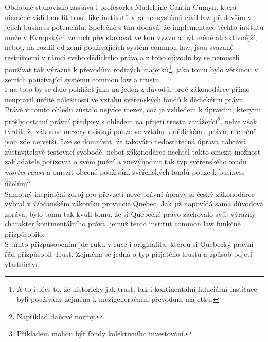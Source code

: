 \documentclass{article}
\begin{document}
Obdobné stanovisko zastává i profesorka Madeleine Cantin Cumyn, která nicméně vidí benefit trust like institutů v rámci systémů civil law především v jejich business potenciálu. Společně s tím dodává, že implementace těchto intitutů může v Evropských zemích představovat velkou výzvu a být méně atraktivnější, neboť, na rozdíl od zemí používajících systém common law, jsou svázané restrikcemi v rámci svého dědického práva a z toho důvodu by se nemuseli používat tak výrazně k převodům rodiných majetků\footnote{A to i přes to, že historicky jak trust, tak i kontinentální fiduciární instituce byli používány zejména k mezigeneračním převodům majetku.}, jako tomu bylo většinou v zemích používající systému common law a trustu.\\


I na toto by se dalo pohlížet jako na jeden z důvodů, proč zákonodárce přímo neupravil určité náležitosti ve vztahu svěřenských fondů k dědickému právu. Právě v tomto ohledu zůstalo nejvíce mezer, což je vzhledem k úpravám, kterými prošly ostatní právní předpisy s ohledem na přijetí trustu zarážející\footnote{Například daňové normy.}, nelze však tvrdit, že zákonné mezery existují pouze ve vztahu k dědickému právu, nicméně jsou zde největší. Lze se domnívat, že takováto nedostatečná úprava nahrává zůstavitelově testovací svobodě, neboť zákonodárce nechtěl takto omezit možnost zakladatele pořizovat o svém jmění a znevýhodnit tak typ svěřenského fondu \textit{mortis causa} a omezit obecné použivání svěřenských fondů pouze k business účelům\footnote{Příkladem mohou být fondy kolektivního investování.}.\\

Samotný inspirační zdroj pro převzetí nové právní úpravy si český zákonodárce vybral v Občanském zákoníku provincie Quebec. Jak již napovídá sama důvodová zpráva, bylo tomu tak kvůli tomu, že si Quebecké právo zachovalo svůj výrazný charakter kontinentálního práva, jemuž tento institut common law funkčně přizpůsobilo.\\

S tímto přizpůsobením jde ruku v ruce i originalita, kterou si Quebecký právní řád přizpůsobil Trust. Zejména se jedná o typ přijatého trustu a způsob pojetí vlastnictví.\\
\end{document}
